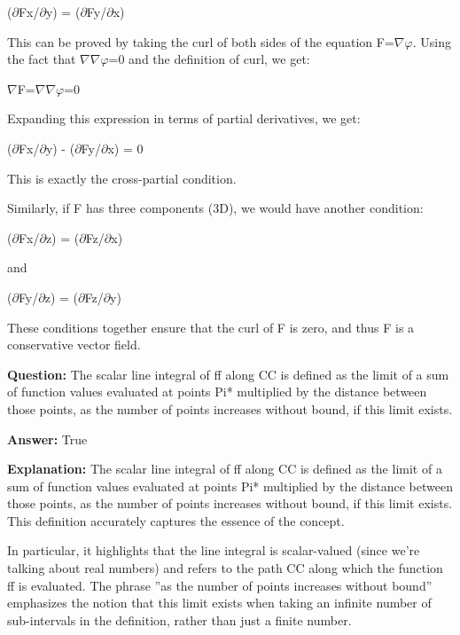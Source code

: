 \documentclass{article}
\begin{document}
(\ensuremath{\partial}Fx/\ensuremath{\partial}y) = (\ensuremath{\partial}Fy/\ensuremath{\partial}x)

This can be proved by taking the curl of both sides of the equation F=\ensuremath{\nabla}\ensuremath{\varphi}. Using the fact that \ensuremath{\nabla}{\texttimes}\ensuremath{\nabla}\ensuremath{\varphi}=0 and the definition of curl, we get:

\ensuremath{\nabla}{\texttimes}F=\ensuremath{\nabla}{\texttimes}\ensuremath{\nabla}\ensuremath{\varphi}=0

Expanding this expression in terms of partial derivatives, we get:

(\ensuremath{\partial}Fx/\ensuremath{\partial}y) - (\ensuremath{\partial}Fy/\ensuremath{\partial}x) = 0

This is exactly the cross-partial condition.

Similarly, if F has three components (3D), we would have another condition:

(\ensuremath{\partial}Fx/\ensuremath{\partial}z) = (\ensuremath{\partial}Fz/\ensuremath{\partial}x)

and

(\ensuremath{\partial}Fy/\ensuremath{\partial}z) = (\ensuremath{\partial}Fz/\ensuremath{\partial}y)

These conditions together ensure that the curl of F is zero, and thus F is a conservative vector field.
                
                \vspace{0.5cm} 
        
            
                \textbf {Question:} The scalar line integral of ff along CC is defined as the limit of a sum of function values evaluated at points Pi* multiplied by the distance between those points, as the number of points increases without bound, if this limit exists.
                
                \textbf{Answer:} True

                \textbf{Explanation:} The scalar line integral of ff along CC is defined as the limit of a sum of function values evaluated at points Pi* multiplied by the distance between those points, as the number of points increases without bound, if this limit exists. This definition accurately captures the essence of the concept.

In particular, it highlights that the line integral is scalar-valued (since we're talking about real numbers) and refers to the path CC along which the function ff is evaluated. The phrase ''as the number of points increases without bound'' emphasizes the notion that this limit exists when taking an infinite number of sub-intervals in the definition, rather than just a finite number.
\end{document}

